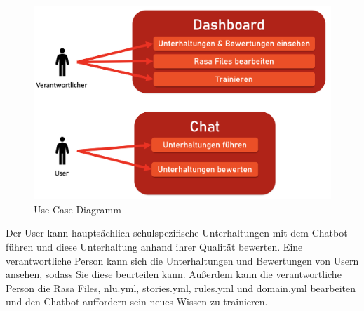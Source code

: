 \begin{figure}[hbt!]
    \centering
    \includegraphics[scale=0.5]{pics/usecase}
    \caption{Use-Case Diagramm}
    \label{fig:impl:usecase}
\end{figure}

Der User kann hauptsächlich schulspezifische Unterhaltungen mit dem Chatbot führen und diese Unterhaltung anhand ihrer Qualität bewerten.
Eine verantwortliche Person kann sich die Unterhaltungen und Bewertungen von Usern ansehen, sodass Sie diese beurteilen kann.
Außerdem kann die verantwortliche Person die Rasa Files, nlu.yml, stories.yml, rules.yml und domain.yml bearbeiten und den Chatbot auffordern sein neues Wissen zu trainieren.

